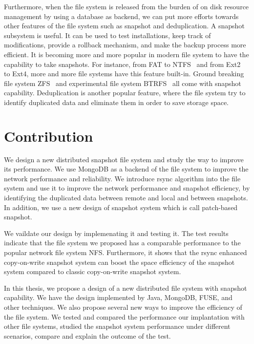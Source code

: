     Furthermore, when the file system is released from the burden of on disk resource management by using a database as backend, we can put more efforts towards other features of the file system such as snapshot and deduplication. A snapshot subsystem is useful. It can be used to test installations, keep track of modifications, provide a rollback mechanism, and make the backup process more efficient. It is becoming more and more popular in modern file system to have the capability to take snapshots. For instance, from FAT to NTFS~\cite{ntfs} and from Ext2~\cite{ext2_wiki} to Ext4, more and more file systems have this feature built-in. Ground breaking file system ZFS~\cite{zfs_wiki} and experimental file system BTRFS~\cite{btrfs} all come with snapshot capability. Deduplication is another popular feature, where the file system try to identify duplicated data and eliminate them in order to save storage space.

\section{Contribution}

    We design a new distributed snapshot file system and study the way to improve its performance. We use MongoDB as a backend of the file system to improve the network performance and reliability. We introduce rsync algorithm into the file system and use it to improve the network performance and snapshot efficiency, by identifying the duplicated data between remote and local and between snapshots. In addition, we use a new design of snapshot system which is call patch-based snapshot. 

    We vaildate our design by implemenating it and testing it. The test results indicate that the file system we proposed has a comparable performance to the popular network file system NFS. Furthermore, it shows that the rsync enhanced copy-on-write snapshot system can boost the space efficiency of the snapshot system compared to classic copy-on-write snapshot system.

    In this thesis, we propose a design of a new distributed file system with snapshot capability. We have the design implemented by Java, MongoDB, FUSE, and other techniques. We also propose several new ways to improve the efficiency of the file system. We tested and compared the performance our implantation with other file systems, studied the snapshot system performance under different scenarios, compare and explain the outcome of the test.
